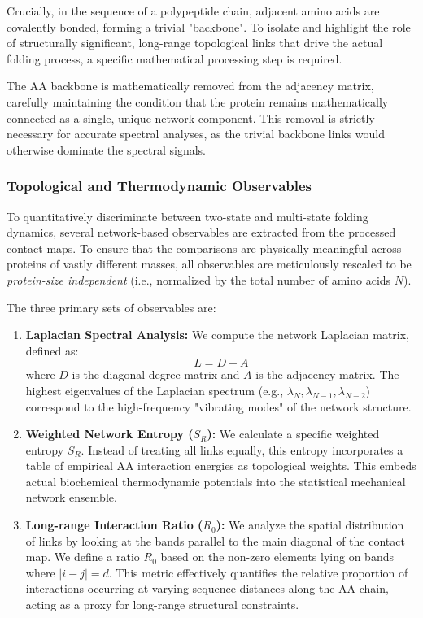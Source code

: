 Crucially, in the sequence of a polypeptide chain, adjacent amino acids are covalently bonded, forming a trivial "backbone". To isolate and highlight the role of structurally significant, long-range topological links that drive the actual folding process, a specific mathematical processing step is required.


The AA backbone is mathematically removed from the adjacency matrix, carefully maintaining the condition that the protein remains mathematically connected as a single, unique network component. This removal is strictly necessary for accurate spectral analyses, as the trivial backbone links would otherwise dominate the spectral signals.

\subsubsection{Topological and Thermodynamic Observables}
\label{subsubsec:folding_observables}

To quantitatively discriminate between two-state and multi-state folding dynamics, several network-based observables are extracted from the processed contact maps. To ensure that the comparisons are physically meaningful across proteins of vastly different masses, all observables are meticulously rescaled to be \textit{protein-size independent} (i.e., normalized by the total number of amino acids \(N\)).

The three primary sets of observables are:
\begin{enumerate}
    \item \textbf{Laplacian Spectral Analysis:} We compute the network Laplacian matrix, defined as:
          \[
              L = D - A
          \]
          where \(D\) is the diagonal degree matrix and \(A\) is the adjacency matrix. The highest eigenvalues of the Laplacian spectrum (e.g., \(\lambda_N, \lambda_{N-1}, \lambda_{N-2}\)) correspond to the high-frequency "vibrating modes" of the network structure.
    \item \textbf{Weighted Network Entropy (\(S_R\)):} We calculate a specific weighted entropy \(S_R\). Instead of treating all links equally, this entropy incorporates a table of empirical AA interaction energies as topological weights. This embeds actual biochemical thermodynamic potentials into the statistical mechanical network ensemble.
    \item \textbf{Long-range Interaction Ratio (\(R_0\)):} We analyze the spatial distribution of links by looking at the bands parallel to the main diagonal of the contact map. We define a ratio \(R_0\) based on the non-zero elements lying on bands where \(|i - j| = d\). This metric effectively quantifies the relative proportion of interactions occurring at varying sequence distances along the AA chain, acting as a proxy for long-range structural constraints.
\end{enumerate}

